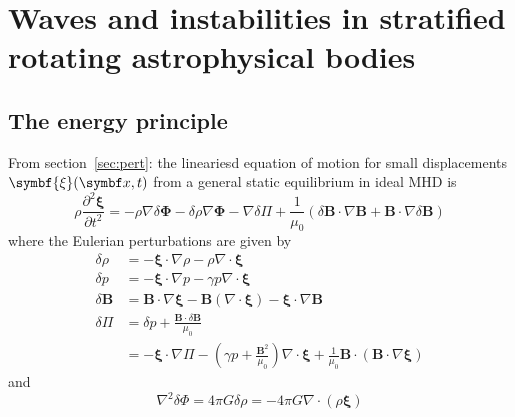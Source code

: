 \documentclass{jknotes}
\newcommand{\B}{\symbf{B}}
\newcommand{\flux}{\symbf{\Phi}}
\newcommand{\disp}{\symbf{\xi}}
\begin{document}
\section{Waves and instabilities in stratified rotating astrophysical bodies}
\subsection{The energy principle}
From section~\ref{sec:pert}: the lineariesd equation of motion for small
displacements $\disp(\x,t)$ from a general static equilibrium in ideal MHD is
\begin{equation}
	\rho \frac{\partial^2 \disp}{\partial t^2} = -\rho \nabla \delta \flux -
	\delta \rho \nabla \flux - \nabla \delta \Pi + \frac{1}{\mu_0}(\delta \B
	\cdot \nabla \B + \B \cdot \nabla \delta \B)
\end{equation}
where the Eulerian perturbations are given by
\begin{align}
	\delta \rho &= -\disp \cdot \nabla \rho - \rho \nabla \cdot \disp \\
	\delta p &= -\disp \cdot \nabla p - \gamma p \nabla \cdot \disp \\
	\delta \B &= \B \cdot \nabla \disp - \B (\nabla \cdot \disp) - \disp \cdot
			  \nabla \B\\
	\delta \Pi &= \delta p + \frac{\B \cdot \delta \B}{\mu_0} \\
			   &= -\disp \cdot \nabla \Pi - \left( \gamma p +
			   \frac{\B^2}{\mu_0}\right) \nabla \cdot \disp + \frac{1}{\mu_0}
			   \B \cdot (\B \cdot \nabla \disp)
\end{align}
and 
\begin{equation}
	\nabla^2 \delta \Phi = 4\pi G \delta \rho = -4\pi G \nabla \cdot (\rho
	\disp)
\end{equation}
\end{document}
